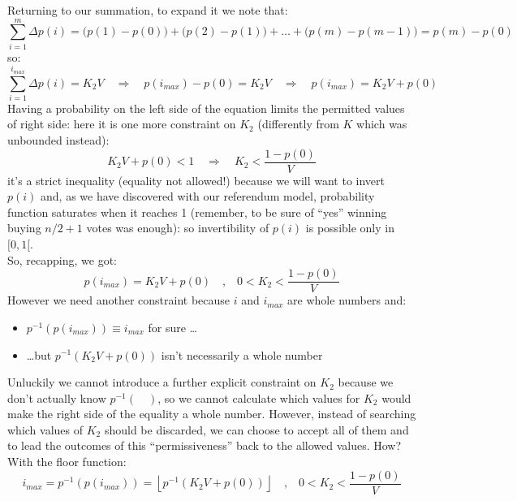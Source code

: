 \documentclass[10pt,a4paper]{article}
\begin{document}
	Returning to our summation, to expand it we note that:
	\begin{equation*}
		\sum_{i=1}^{m} \Delta p(i) = \big(p(1)-p(0)\big) + \big(p(2)-p(1)\big) + \dots + \big(p(m)-p(m-1)\big) = p(m)-p(0)
	\end{equation*}
	so:
	\begin{equation*}
		\sum_{i=1}^{i_{max}} \Delta p(i) = K_{2}V \quad \Longrightarrow \quad p(i_{max})-p(0) =  K_{2}V \quad \Longrightarrow \quad p(i_{max}) = K_{2}V + p(0)
	\end{equation*}
	Having a probability on the left side of the equation limits the permitted values of right side: here it is one more constraint on $K_{2}$ (differently from $K$ which was unbounded instead):
	\begin{equation*}
		K_{2}V+p(0)<1 \quad \Longrightarrow \quad K_{2} < \frac{1-p(0)}{V}
	\end{equation*}
	it’s a strict inequality (equality not allowed!) because we will want to invert $p(i)$ and, as we have discovered with our referendum model, probability function saturates when it reaches 1 (remember, to be sure of \enquote{yes} winning buying $n/2 + 1$ votes was enough): so invertibility of $p(i)$ is possible only in $[0,1[$.\\
	So, recapping, we got:
	\begin{equation*}
		p(i_{max}) = K_{2}V + p(0) \quad \textrm{,} \quad 0 < K_{2} < \frac{1-p(0)}{V}
	\end{equation*}
	However we need another constraint because $i$ and $i_{max}$ are whole numbers and:
	\begin{itemize}
		\item $p^{-1}(p(i_{max})) \equiv i_{max}$ for sure \dots
		\item \dots but $p^{-1}(K_{2}V+p(0))$ isn’t necessarily a whole number
	\end{itemize}
	Unluckily we cannot introduce a further explicit constraint on $K_{2}$ because we don’t actually know $p^{-1}(\quad)$, so we cannot calculate which values for $K_{2}$ would make the right side of the equality a whole number. However, instead of searching which values of $K_{2}$ should be discarded, we can choose to accept all of them and to lead the outcomes of this \enquote{permissiveness} back to the allowed values. How? With the floor function:
	\begin{equation*}
		i_{max} = p^{-1}(p(i_{max})) = \left\lfloor p^{-1}(K_{2}V+p(0)) \right\rfloor \quad \textrm{,} \quad 0 < K_{2} < \frac{1-p(0)}{V}
	\end{equation*}
\end{document}
